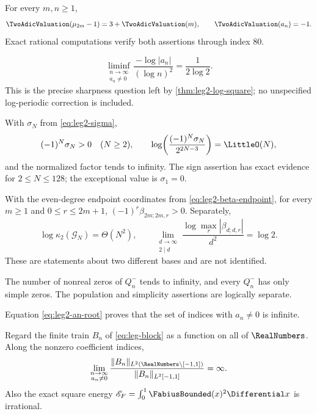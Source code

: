 \begin{conjecture}
\label{conj:leg2-two-adic}
For every $m,n\ge1$,
\[
 \TwoAdicValuation(\mu_{2m}-1)=3+\TwoAdicValuation(m),
 \qquad
 \TwoAdicValuation(a_n)=-1.
\]
Exact rational computations verify both assertions through index $80$.
\end{conjecture}

\begin{conjecture}
\label{conj:leg2-sharp-log-square}
\[
 \liminf_{\substack{n\to\infty\\a_n\ne0}}
 \frac{-\log|a_n|}{(\log n)^2}=\frac1{2\log2}.
\]
This is the precise sharpness question left by
\cref{thm:leg2-log-square}; no unspecified log-periodic correction is included.
\end{conjecture}

\begin{conjecture}
\label{conj:leg2-central-arithmetic}
With $\sigma_N$ from \eqref{eq:leg2-sigma},
\[
 (-1)^N\sigma_N>0\quad(N\ge2),\qquad
 \log\!\left(\frac{(-1)^N\sigma_N}{2^{2N-3}}\right)=\LittleO(N),
\]
and the normalized factor tends to infinity.  The sign assertion has exact
evidence for $2\le N\le128$; the exceptional value is $\sigma_1=0$.
\end{conjecture}

\begin{conjecture}
\label{conj:leg2-endpoint-signs}
With the even-degree endpoint coordinates from
\eqref{eq:leg2-beta-endpoint}, for every $m\ge1$ and
$0\le r\le2m+1$,
$(-1)^r\beta_{2m;2m,r}>0$.  Separately,
\[
 \log\kappa_2(\mathcal G_N)=\Theta(N^2),
 \qquad
 \lim_{\substack{d\to\infty\\2\mid d}}
 \frac{\log\max_r|\beta_{d;d,r}|}{d^2}=\log2.
\]
These are statements about two different bases and are not identified.
\end{conjecture}

\begin{conjecture}
\label{conj:leg2-complex-zeros}
The number of nonreal zeros of $Q_n^-$ tends to infinity, and every
$Q_n^-$ has only simple zeros.  The population and simplicity assertions are
logically separate.
\end{conjecture}

Equation \eqref{eq:leg2-an-root} proves that the set of indices with
$a_n\ne0$ is infinite.

\begin{conjecture}
\label{conj:leg2-exterior-energy}
Regard the finite train $B_n$ of \eqref{eq:leg-block} as a function on all of
$\RealNumbers$.  Along the nonzero coefficient indices,
\[
 \lim_{\substack{n\to\infty\\a_n\ne0}}
 \frac{\|B_n\|_{L^2(\RealNumbers\setminus[-1,1])}}
 {\|B_n\|_{L^2[-1,1]}}=\infty.
\]
Also the exact square energy
$\mathscr E_F=\int_0^1\FabiusBounded(x)^2\Differential x$ is irrational.
\end{conjecture}

